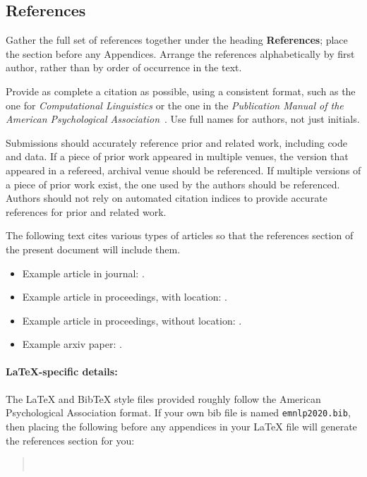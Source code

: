 \documentclass[11pt,a4paper]{article}
\begin{document}
\subsection{References}
Gather the full set of references together under the heading \textbf{References}; place the section before any Appendices. 
Arrange the references alphabetically by first author, rather than by order of occurrence in the text.

Provide as complete a citation as possible, using a consistent format, such as the one for \emph{Computational Linguistics\/} or the one in the  \emph{Publication Manual of the American 
Psychological Association\/}~\citep{APA:83}.
Use full names for authors, not just initials.

Submissions should accurately reference prior and related work, including code and data.
If a piece of prior work appeared in multiple venues, the version that appeared in a refereed, archival venue should be referenced.
If multiple versions of a piece of prior work exist, the one used by the authors should be referenced.
Authors should not rely on automated citation indices to provide accurate references for prior and related work.

The following text cites various types of articles so that the references section of the present document will include them.
\begin{itemize}
\item Example article in journal: \citep{Ando2005}.
\item Example article in proceedings, with location: \citep{borschinger-johnson-2011-particle}.
\item Example article in proceedings, without location: \citep{andrew2007scalable}.
\item Example arxiv paper: \citep{rasooli-tetrault-2015}. 
\end{itemize}


\paragraph{\LaTeX-specific details:}
The \LaTeX{} and Bib\TeX{} style files provided roughly follow the American Psychological Association format.
If your own bib file is named \texttt{\small emnlp2020.bib}, then placing the following before any appendices in your \LaTeX{}  file will generate the references section for you:
\begin{quote}\small
\verb||\\
\verb||
\end{quote}
\end{document}
